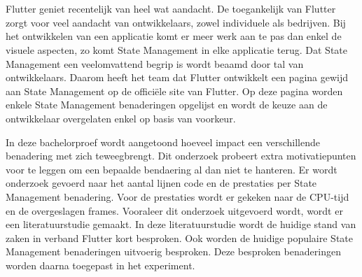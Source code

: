 
%
%



\chapter*{}
Flutter geniet recentelijk van heel wat aandacht. De toegankelijk van Flutter zorgt voor veel aandacht van ontwikkelaars, zowel individuele als bedrijven. Bij het ontwikkelen van een applicatie komt er meer werk aan te pas dan enkel de visuele aspecten, zo komt State Management in elke applicatie terug. Dat State Management een veelomvattend begrip is wordt beaamd door tal van ontwikkelaars. Daarom heeft het team dat Flutter ontwikkelt een pagina gewijd aan State Management op de officiële site van Flutter. Op deze pagina worden enkele State Management benaderingen opgelijst en wordt de keuze aan de ontwikkelaar overgelaten enkel op basis van voorkeur.\newline 

In deze bachelorproef wordt aangetoond hoeveel impact een verschillende benadering met zich teweegbrengt. Dit onderzoek probeert extra motivatiepunten voor te leggen om een bepaalde bendaering al dan niet te hanteren. Er wordt onderzoek gevoerd naar het aantal lijnen code en de prestaties per State Management benadering. Voor de prestaties wordt er gekeken naar de CPU-tijd en de overgeslagen frames.
\newline
Vooraleer dit onderzoek uitgevoerd wordt, wordt er een literatuurstudie gemaakt. In deze literatuurstudie wordt de huidige stand van zaken in verband Flutter kort besproken. Ook worden de huidige populaire State Management benaderingen uitvoerig besproken. Deze besproken benaderingen worden daarna toegepast in het experiment. \newline 

